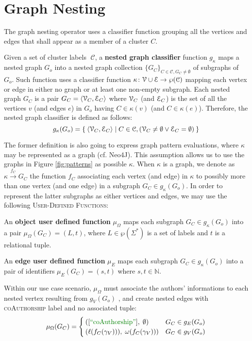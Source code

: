 \section{Graph Nesting}\label{sec:nestingdef}
The graph nesting operator uses a classifier function grouping all the vertices and edges that shall appear as a member of a cluster $C$. 

\begin{definition}
	Given a set of cluster labels $\;\mathcal{C}$, a \textbf{nested graph classifier} function $g_\kappa$ maps a nested graph $G_o$ into a nested  graph collection $\{G_C\}_{C\in\mathcal{C},G_C\neq \emptyset}$ of subgraphs of $G_o$. Such function uses a classifier function $\kappa\colon \mathcal{V}\cup \mathcal{E}\to \wp(\mathcal{C})$ mapping each vertex or edge in either no graph or at least one non-empty subgraph. Each nested graph $G_C$ is a pair
	$G_C=\Braket{\mathcal{V}_C,\mathcal{E}_C}$
	where $\mathcal{V}_C$ (and $\mathcal{E}_C$) is the set of all the vertices $v$ (and edges $e$) in $G_o$ having $C\in \kappa(v)$ (and $C\in \kappa(e)$). Therefore, the nested graph classifier is defined as follows:
	\[g_\kappa(G_o)=\Set{\Braket{\mathcal{V}_C,\mathcal{E}_C}|C\in\mathcal{C},(\mathcal{V}_C\neq\emptyset\vee\mathcal{E}_C=\emptyset)}\]
\end{definition}

The former definition is also going to express graph pattern evaluations, where $\kappa$ may be represented as a graph (cf. Neo4J). This assumption allows us to use the graphs in Figure \ref{fig:patterns} as possible $\kappa$. When $\kappa$ is a graph, we denote as $\kappa\xrightarrow{f_C} G_C$ the function $f_C$ associating  each vertex (and edge) in $\kappa$ to possibly more than one vertex (and one edge) in a subgraph $G_C\in g_\kappa(G_o)$. In order to represent the latter subgraphs  as either vertices and edges, we may use
the following \textsc{User-Defined Functions}:
\begin{definition}
	An \textbf{object user defined function} $\mu_\Omega$ maps each subgraph $G_C\in g_\kappa(G_o)$ into a pair $\mu_\Omega(G_C)=(L,t)$, where $L\in\wp(\Sigma^*)$ is a set of labels and $t$ is a relational tuple.
	
	An \textbf{edge user defined function} $\mu_E$ maps each subgraph $G_C\in g_\kappa(G_o)$ into a pair of identifiers $\mu_E(G_C)=(s,t)$ where $s,t\in\mathbb{N}$.
\end{definition}

\begin{example}
	Within our use case scenario, $\mu_\Omega$  must associate  the authors' informations to each nested vertex resulting from $g_{V}(G_{o})$ , and create nested edges with \textsc{coAuthorship} label and no associated tuple:
	\[\mu_\Omega(G_C)=\begin{cases}
	([\mstr{coAuthorship}],\;\emptyset) & G_C \in g_E(G_{o})\\
	(\ell(f_C(\gamma_V))),\;\omega(f_C(\gamma_V))) & G_C \in g_V(G_{o})\\
	\end{cases}\]
\end{example}


